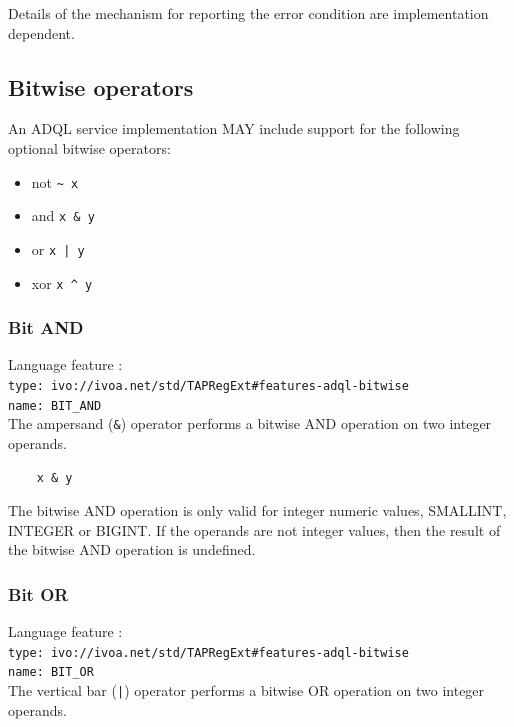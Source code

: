\documentclass[11pt,a4paper]{ivoa}
\begin{document}
Details of the mechanism for reporting the error condition are
implementation dependent.

\subsection{Bitwise operators}
\label{sec:bitwise}

An ADQL service implementation MAY include support for the following optional
bitwise operators:

\begin{itemize}
    \item not \verb:~ x:
    \item and \verb:x & y: 
    \item or  \verb:x | y:
    \item xor \verb:x ^ y:
\end{itemize}

\subsubsection{Bit AND}
\label{sec:bitwise.and}
{\footnotesize Language feature :}\\
{\footnotesize \verb|type: ivo://ivoa.net/std/TAPRegExt#features-adql-bitwise|}\\
{\footnotesize \verb|name: BIT_AND|}\\

The ampersand (\verb:&:) operator performs a bitwise AND operation
on two integer operands.

\begin{verbatim}
    x & y
\end{verbatim}

The bitwise AND operation is only valid for integer numeric values,
SMALLINT, INTEGER or BIGINT.
If the operands are not integer values, then the result of the bitwise
AND operation is undefined.

\subsubsection{Bit OR}
\label{sec:bitwise.or}
{\footnotesize Language feature :}\\
{\footnotesize \verb|type: ivo://ivoa.net/std/TAPRegExt#features-adql-bitwise|}\\
{\footnotesize \verb|name: BIT_OR|}\\

The vertical bar (\verb:|:) operator performs a bitwise OR operation
on two integer operands.
\end{document}
